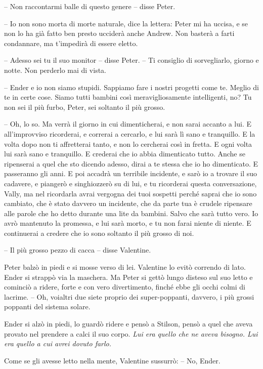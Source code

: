 {-- Non raccontarmi balle di questo genere -- disse Peter.}

{-- Io non sono morta di morte naturale, dice la lettera: Peter mi ha
	uccisa, e se non lo ha già fatto ben presto ucciderà anche Andrew. Non
	basterà a farti condannare, ma t'impedirà di essere eletto.}

{-- Adesso sei tu il suo monitor -- disse Peter. -- Ti consiglio di
	sorvegliarlo, giorno e notte. Non perderlo mai di vista.}

{-- Ender e io non siamo stupidi. Sappiamo fare i nostri progetti come
	te. Meglio di te in certe cose. Siamo tutti bambini così
	meravigliosamente intelligenti, no? Tu non sei il più furbo, Peter, sei
	soltanto il più grosso.}

{-- Oh, lo so. Ma verrà il giorno in cui dimenticherai, e non sarai
	accanto a lui. E all'improvviso ricorderai, e correrai a cercarlo, e lui
	sarà lì sano e tranquillo. E la volta dopo non ti affretterai tanto, e
	non lo cercherai così in fretta. E ogni volta lui sarà sano e
	tranquillo. E crederai che io abbia dimenticato tutto. Anche se
	ripenserai a quel che sto dicendo adesso, dirai a te stessa che io ho
	dimenticato. E passeranno gli anni. E poi accadrà un terribile
	incidente, e sarò io a trovare il suo cadavere, e piangerò e
	singhiozzerò su di lui, e tu ricorderai questa conversazione, Vally, ma
	nel ricordarla avrai vergogna dei tuoi sospetti perché saprai che io
	sono cambiato, che è stato davvero un incidente, che da parte tua è
	crudele ripensare alle parole che ho detto durante una lite da bambini.
	Salvo che sarà tutto vero. Io avrò mantenuto la promessa, e lui sarà
	morto, e tu non farai niente di niente. E continuerai a credere che io
	sono soltanto il più grosso di noi.}

{-- Il più grosso pezzo di cacca -- disse Valentine.}

{Peter balzò in piedi e si mosse verso di lei. Valentine lo evitò
	correndo di lato. Ender si strappò via la maschera. Ma Peter si gettò
	lungo disteso sul suo letto e cominciò a ridere, forte e con vero
	divertimento, finché ebbe gli occhi colmi di lacrime. -- Oh, voialtri
	due siete proprio dei super-poppanti, davvero, i più grossi poppanti del
	sistema solare.}

{Ender si alzò in piedi, lo guardò ridere e pensò a Stilson, pensò a
	quel che aveva provato nel prendere a calci il suo corpo. \emph{Lui era
		quello che ne aveva bisogno. Lui era quello a cui avrei dovuto farlo.}}

{Come se gli avesse letto nella mente, Valentine sussurrò: -- No,
	Ender.}

